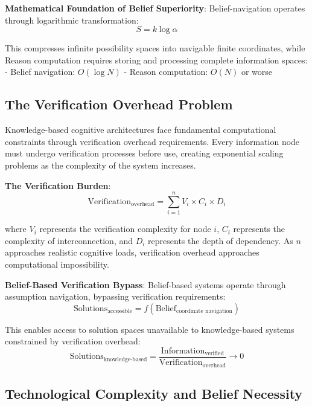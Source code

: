 \documentclass[12pt,a4paper]{article}
\begin{document}
\textbf{Mathematical Foundation of Belief Superiority}: Belief-navigation operates through logarithmic transformation:
\begin{equation}
S = k \log \alpha
\end{equation}

This compresses infinite possibility spaces into navigable finite coordinates, while Reason computation requires storing and processing complete information spaces:
- Belief navigation: $O(\log N)$
- Reason computation: $O(N)$ or worse

\subsection{The Verification Overhead Problem}

Knowledge-based cognitive architectures face fundamental computational constraints through verification overhead requirements. Every information node must undergo verification processes before use, creating exponential scaling problems as the complexity of the system increases.

\textbf{The Verification Burden}:
\begin{equation}
\text{Verification}_{\text{overhead}} = \sum_{i=1}^{n} V_i \times C_i \times D_i
\end{equation}

where $V_i$ represents the verification complexity for node $i$, $C_i$ represents the complexity of interconnection, and $D_i$ represents the depth of dependency. As $n$ approaches realistic cognitive loads, verification overhead approaches computational impossibility.

\textbf{Belief-Based Verification Bypass}: Belief-based systems operate through assumption navigation, bypassing verification requirements:
\begin{equation}
\text{Solutions}_{\text{accessible}} = f(\text{Belief}_{\text{coordinate navigation}})
\end{equation}

This enables access to solution spaces unavailable to knowledge-based systems constrained by verification overhead:
\begin{equation}
\text{Solutions}_{\text{knowledge-based}} = \frac{\text{Information}_{\text{verified}}}{\text{Verification}_{\text{overhead}}} \rightarrow 0
\end{equation}

\subsection{Technological Complexity and Belief Necessity}
\end{document}
